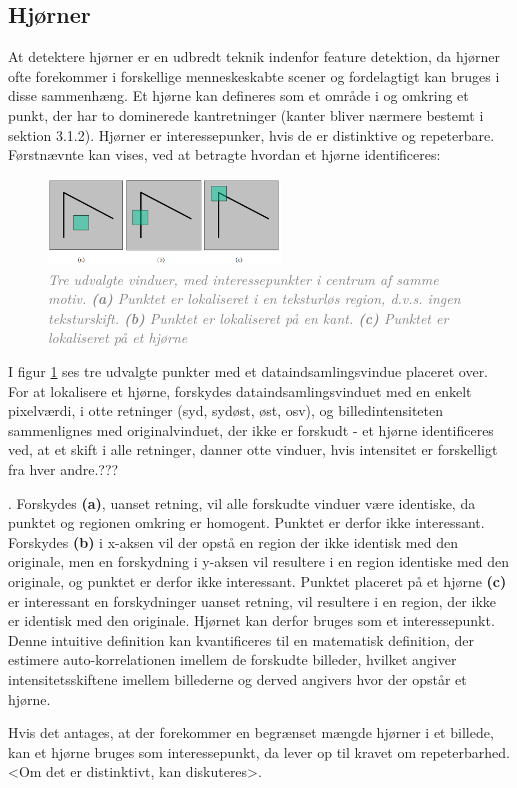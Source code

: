 \subsection{Hjørner}\label{subsec:corner}
At detektere hjørner er en udbredt teknik indenfor feature detektion, da hjørner ofte forekommer i forskellige menneskeskabte scener og fordelagtigt kan bruges i disse sammenhæng. Et hjørne kan defineres som et område i og omkring et punkt, der har to dominerede kantretninger (kanter bliver nærmere bestemt i sektion 3.1.2). Hjørner er interessepunker, hvis de er distinktive og repeterbare. Førstnævnte kan vises, ved at betragte hvordan et hjørne identificeres:
\begin{figure}[H]
    \centering
    \includegraphics[width=0.55\textwidth]{fig/6.png}
    \vspace{-1em}   
    \begin{center}    
    \caption{\textcolor{gray}{\footnotesize \textit{
     Tre udvalgte vinduer, med interessepunkter i centrum af samme motiv. \textbf{(a)} Punktet er lokaliseret i en teksturløs region, d.v.s. ingen teksturskift. \textbf{(b)} Punktet er lokaliseret på en kant. \textbf{(c)} Punktet er lokaliseret på et hjørne }}}
    \label{fig:2}
     \end{center}
    \vspace{-2.7em}  
  \end{figure}  
\noindent
I figur \ref{fig:2} ses tre udvalgte punkter med et dataindsamlingsvindue placeret over. For at lokalisere et hjørne, forskydes dataindsamlingsvinduet med en enkelt pixelværdi, i otte retninger (syd, sydøst, øst, osv), og billedintensiteten sammenlignes med originalvinduet, der ikke er forskudt - et hjørne identificeres ved, at et skift i alle retninger, danner otte vinduer, hvis intensitet er forskelligt fra hver andre.???
	
. Forskydes  \textbf{(a)}, uanset retning, vil alle forskudte vinduer være identiske, da punktet og regionen omkring er homogent. Punktet er derfor ikke interessant. Forskydes \textbf{(b)} i x-aksen vil der opstå en region der ikke identisk med den originale, men en forskydning i y-aksen vil resultere i en region identiske med den originale, og punktet er derfor ikke interessant. Punktet placeret på et hjørne \textbf{(c)} er interessant en forskydninger uanset retning, vil resultere i en region, der ikke er identisk med den originale. Hjørnet kan derfor bruges som et interessepunkt. Denne intuitive definition kan kvantificeres til en matematisk definition, der estimere auto-korrelationen imellem de forskudte billeder, hvilket angiver intensitetsskiftene imellem billederne og derved angivers hvor der opstår et hjørne.


Hvis det antages, at der forekommer en begrænset mængde hjørner i et billede, kan et hjørne bruges som interessepunkt, da lever op til kravet om repeterbarhed. <Om det er distinktivt, kan diskuteres>.